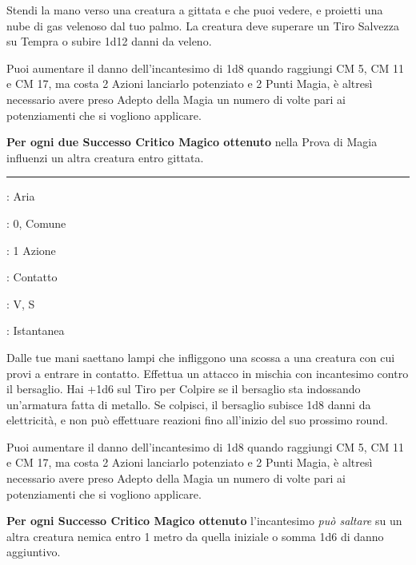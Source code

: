 \begin{multicols}{2}
Stendi la mano verso una creatura a gittata e che puoi vedere, e proietti una nube di gas velenoso dal tuo palmo. La creatura deve superare un Tiro Salvezza su Tempra o subire 1d12 danni da veleno.

Puoi aumentare il danno dell'incantesimo di 1d8 quando raggiungi CM 5, CM 11 e CM 17, ma costa 2 Azioni lanciarlo potenziato e 2 Punti Magia, è altresì necessario avere preso Adepto della Magia un numero di volte pari ai potenziamenti che si vogliono applicare.

\textbf{Per ogni due Successo Critico Magico ottenuto} nella Prova di Magia influenzi un altra creatura entro gittata.

\smallskip\noindent\rule{\linewidth}{2pt} \hypertarget{Stretta Folgorante}{}\medskip{}
\noindent
\begin{description}[noitemsep, topsep=0pt, parsep=0pt, partopsep=0pt, leftmargin=0cm, labelwidth=2.8cm]
	\item[\textbf{Lista di Magia}]: Aria
	\item[\textbf{Livello}]: 0, Comune
	\item[\textbf{T. di Lancio}]: 1 Azione
	\item[\textbf{Gittata}]: Contatto
	\item[\textbf{Componenti}]: V, S
	\item[\textbf{Durata}]: Istantanea
\end{description}

Dalle tue mani saettano lampi che infliggono una scossa a una creatura con cui provi a entrare in contatto. Effettua un attacco in mischia con incantesimo contro il bersaglio. Hai +1d6 sul Tiro per Colpire se il bersaglio sta indossando un'armatura fatta di metallo. Se colpisci, il bersaglio subisce 1d8 danni da elettricità, e non può effettuare reazioni fino all'inizio del suo prossimo round.

Puoi aumentare il danno dell'incantesimo di 1d8 quando raggiungi CM 5, CM 11 e CM 17, ma costa 2 Azioni lanciarlo potenziato e 2 Punti Magia, è altresì necessario avere preso Adepto della Magia un numero di volte pari ai potenziamenti che si vogliono applicare.

\textbf{Per ogni Successo Critico Magico ottenuto} l'incantesimo \emph{può saltare} su un altra creatura nemica entro 1 metro da quella iniziale o somma 1d6 di danno aggiuntivo.


\end{multicols}
